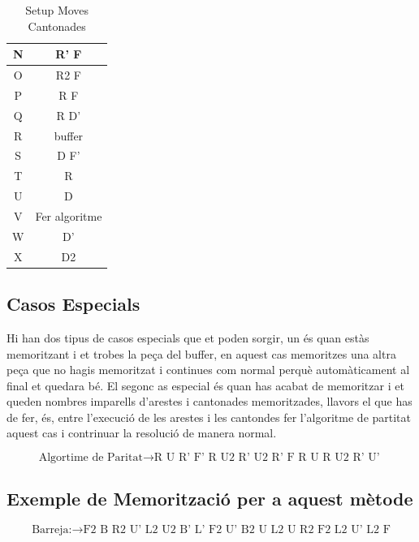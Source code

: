 \begin{table}[h]
\begin{minipage}{.5\linewidth}
\begin{tabular}{|c|c|}
            N & R' F          \\ 
            \hline
            O & R2 F          \\ 
            \hline
            P & R F           \\ 
            \hline
            Q & R D'          \\ 
            \hline
            R & buffer        \\ 
            \hline
            S & D F'          \\ 
            \hline
            T & R             \\ 
            \hline
            U & D             \\ 
            \hline
            V & Fer algoritme \\ 
            \hline
            W & D'            \\ 
            \hline
            X & D2            \\ 
            \hline
        \end{tabular}
    \end{minipage} 
    \caption{Setup Moves Cantonades}
    \label{fig:setup-cantonades}
\end{table}

\subsection{Casos Especials}

Hi han dos tipus de casos especials que et poden sorgir, un és quan estàs memoritzant i et trobes la peça del buffer, en aquest cas memoritzes una altra peça que no hagis memoritzat i continues com normal perquè automàticament al final et quedara bé.
El segonc as especial és quan has acabat de memoritzar i et queden nombres imparells d'arestes i cantonades memoritzades, llavors el que has de fer, és, entre l'execució de les arestes i les cantondes fer l'algoritme de partitat aquest cas i contrinuar la resolució de manera normal.

$$ \textrm{Algortime de Paritat} \rightarrow \textrm{R U R' F' R U2 R' U2 R' F R U R U2 R' U' } $$

\subsection{Exemple de Memorització per a aquest mètode}

$$ \textrm{Barreja:} \rightarrow \textrm{F2 B R2 U' L2 U2 B' L' F2 U' B2 U L2 U R2 F2 L2 U' L2 F} $$

